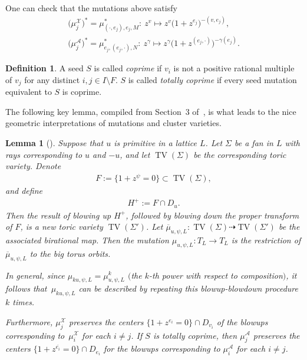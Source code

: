 \documentclass[10pt,a4paper]{amsart}
\numberwithin{equation}{section}
\numberwithin{figure}{section}
\numberwithin{table}{section}
\DeclareMathOperator{\TV}{TV}
\let\?=\overline
\let\rar=\rightarrow
\let\s=\mathcal
\newtheorem{lem}[thm]{Lemma}
\theoremstyle{definition}
\newtheorem{dfn}[thm]{Definition}
\begin{document}
One can check that the mutations above satisfy
\begin{gather*}%
	\big(\mu_j^{\s{X}}\big)^*=\mu_{(\cdot,e_j),e_j,M}^*\colon \ z^{v} \mapsto z^{v}\big(1+z^{e_j}\big)^{-(v,e_j)},\\
	\big(\mu_j^{\s{A}}\big)^*=\mu_{e_j,( e_j,\cdot ),N}^*\colon \ z^{\gamma} \mapsto z^{\gamma}\big(1+z^{( e_j,\cdot)}\big)^{-\gamma(e_j)}.
\end{gather*}

\begin{dfn}\label{coprime}A seed $S$ is called {\it coprime} if $v_i$ is not a positive rational multiple of $v_j$ for any distinct $i,j \in I\setminus F$. $S$ is called {\it totally coprime} if every seed mutation equivalent to $S$ is coprime.
\end{dfn}

The following key lemma, compiled from Section~3 of~\cite{GHK3}, is what leads to the nice geometric interpretations of mutations and cluster varieties.

\begin{lem}[\cite{GHK3}]\label{mugeom}Suppose that $u$ is primitive in a lattice $L$. Let $\Sigma$ be a fan in $L$ with rays corresponding to $u$ and $-u$, and let $\TV(\Sigma)$ be the corresponding toric variety. Denote
\begin{gather*}
 F:=\big\{1+z^{\psi}=0\big\}\subset \TV(\Sigma),
\end{gather*}
and define
\begin{gather*}
H^+:=F\cap D_{u}.
\end{gather*}
Then the result of blowing up $H^+$, followed by blowing down the proper transform of $F$, is a new toric variety $\TV(\Sigma')$. Let $\?{\mu}_{u,\psi,L}\colon \TV(\Sigma)\dashrightarrow \TV(\Sigma')$ be the associated birational map. Then the mutation $\mu_{u,\psi,L}\colon T_L\rar T_L$ is the restriction of $\?{\mu}_{u,\psi,L}$ to the big torus orbits.

In general, since $\mu_{ku,\psi,L}=\mu_{u,\psi,L}^k$ $($the $k$-th power with respect to composition$)$, it follows that~$\mu_{ku,\psi,L}$ can be described by repeating this blowup-blowdown procedure $k$ times.

Furthermore, $\mu_j^{\s{X}}$ preserves the centers $\big\{1+z^{e_i}=0\big\}\cap D_{v_i}$ of the blowups corresponding to~$\mu_i^{\s{X}}$ for each $i \neq j$. If $S$ is totally coprime, then $\mu_j^{\s{A}}$ preserves the centers $\big\{1+z^{\?{e_i}}=0\big\}\cap D_{e_i}$ for the blowups corresponding to $\mu_i^{\s{A}}$ for each $i \neq j$.
\end{lem}
\end{document}
